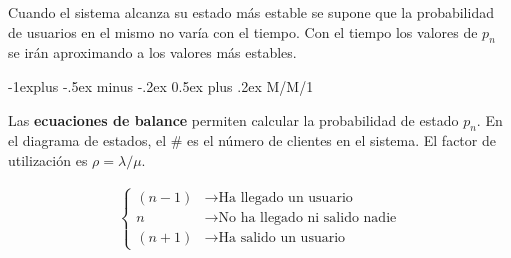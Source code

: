 \documentclass[10pt,landscape]{article}
\makeatletter
\renewcommand{\subsection}{\@startsection{subsection}{2}{0mm}%
                                {-1explus -.5ex minus -.2ex}%
                                {0.5ex plus .2ex}%
                                {\normalfont\normalsize\bfseries}}
\makeatother
\begin{document}
\begin{multicols}{3}
Cuando el sistema alcanza su estado más estable se supone que la probabilidad de usuarios en el mismo no varía con el tiempo. Con el tiempo los valores de $p_{n}$ se irán aproximando a los valores más estables.

\subsection{M/M/1}

Las \textbf{ecuaciones de balance} permiten calcular la probabilidad de estado $p_{n}$. En el diagrama de estados, el $\#$ es el número de clientes en el sistema. El factor de utilización es $\rho = \lambda / \mu$.

\begin{center}
\end{center}

\begin{align*}
  \begin{cases}
      (n-1) & \rightarrow \text{Ha llegado un usuario} \\ 
      n & \rightarrow \text{No ha llegado ni salido nadie} \\
      (n+1) & \rightarrow \text{Ha salido un usuario}
    \end{cases}
\end{align*}


\end{multicols}
\end{document}
